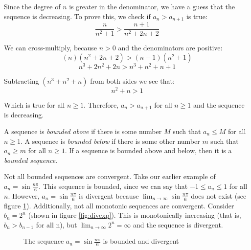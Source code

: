 Since the degree of $n$ is greater in the denominator, we have a guess that 
the sequence is decreasing. To prove this, we check if $a_n > a_{n+1}$ is true:
$$\frac{n}{n^2 + 1} > \frac{n + 1}{n^2 + 2n + 2}$$

We can cross-multiply, because $n > 0$ and the denominators are positive:
$$(n)(n^2 + 2n + 2) > (n+1)(n^2 + 1)$$
$$n^3 + 2n^2 + 2n > n^3 + n^2 + n + 1$$

Subtracting $(n^3 + n^2 + n)$ from both sides we see that:
$$n^2 + n > 1$$

Which is true for all $n \geq1$. Therefore, $a_n > a_{n+1}$ for all $n \geq 1$ 
and the sequence is decreasing. 

A sequence is \textit{bounded above} if there is some number $M$ such that 
$a_n \leq M$ for all $n \geq 1$. A sequence is \textit{bounded below} if 
there is some other number $m$ such that $a_n \geq m$ for all $n \geq 1$. If a 
sequence is bounded above and below, then it is a \textit{bounded sequence}. 

Not all bounded sequences are convergent. Take our earlier example of $a_n = 
\sin{\frac{n\pi}{6}}$. This sequence is bounded, since we can say that $- 1 
\leq a_n \leq 1$ for all $n$. However, $a_n = \sin{\frac{n\pi}{6}}$ is 
divergent because $\lim_{n \to \infty} \sin{\frac{n\pi}{6}}$ does not exist 
(see figure \ref{fig:divsine}). Additionally, not all monotonic sequences are 
convergent. Consider $b_n = 2^n$ (shown in figure \ref{fig:divexp}). This is 
monotonically increasing (that is, $b_n > b_{n-1}$ for all n), but $\lim_{n \to 
\infty} 2^n = \infty$ and the sequence is divergent. 

\begin{figure}
    \centering
    \caption{The sequence $a_n = \sin{\frac{n\pi}{6}}$ is bounded and divergent}
    \label{fig:divsine}
\end{figure}

